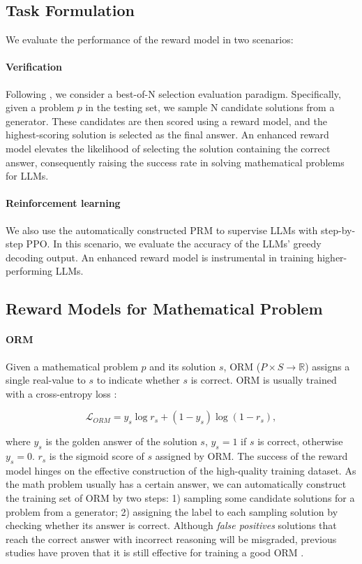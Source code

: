 \subsection{Task Formulation}
\label{subsec:task_formulation}
We evaluate the performance of the reward model in two scenarios:
\paragraph{Verification} Following \citep{lightman2023let}, we consider a best-of-N selection evaluation paradigm. Specifically, given a problem $p$ in the testing set, we sample N candidate solutions from a generator. These candidates are then scored using a reward model, and the highest-scoring solution is selected as the final answer. An enhanced reward model elevates the likelihood of selecting the solution containing the correct answer, consequently raising the success rate in solving mathematical problems for LLMs.
\paragraph{Reinforcement learning} We also use the automatically constructed PRM to supervise LLMs with step-by-step PPO. In this scenario, we evaluate the accuracy of the LLMs' greedy decoding output. An enhanced reward model is instrumental in training higher-performing LLMs.

\subsection{Reward Models for Mathematical Problem}
\label{subsec:reward_model}
\paragraph{ORM} Given a mathematical problem $p$ and its solution $s$, ORM ($P \times S \to \mathbb{R}$) assigns a single real-value to $s$ to indicate whether $s$ is correct. ORM is usually trained with a cross-entropy loss \citep{cobbe2021training, li-etal-2023-making}:

\begin{equation}
    \mathcal{L}_{ORM} = y_s \log r_s + (1 - y_s) \log (1 - r_s),
\end{equation}

where $y_s$ is the golden answer of the solution $s$, $y_s=1$ if $s$ is correct, otherwise $y_s=0$. $r_s$ is the sigmoid score of $s$ assigned by ORM. The success of the reward model hinges on the effective construction of the high-quality training dataset. As the math problem usually has a certain answer, we can automatically construct the training set of ORM by two steps: 1) sampling some candidate solutions for a problem from a generator; 2) assigning the label to each sampling solution by checking whether its answer is correct. Although \textit{false positives} solutions that reach the correct answer with incorrect reasoning will be misgraded, previous studies have proven that it is still effective for training a good ORM \citep{lightman2023let,ovm}.

